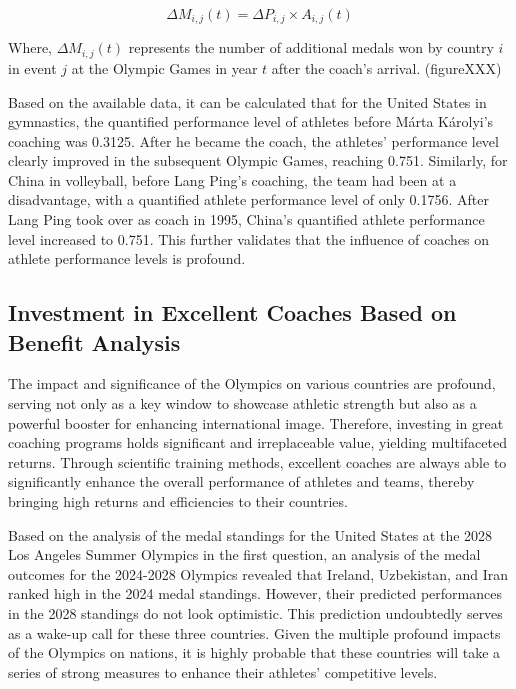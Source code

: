 \documentclass{mcmthesis}
\begin{document}
\begin{equation}
\Delta M_{i, j}(t) = \Delta P_{i, j} \times A_{i, j}(t)
\end{equation}

Where, $\Delta M_{i, j}(t)$ represents the number of additional medals won by country $i$ in event $j$ at the Olympic Games in year $t$ after the coach's arrival.
(figureXXX)

Based on the available data, it can be calculated that for the United States in gymnastics, the quantified performance level of athletes before Márta Károlyi's coaching was 0.3125. After he became the coach, the athletes' performance level clearly improved in the subsequent Olympic Games, reaching 0.751. Similarly, for China in volleyball, before Lang Ping's coaching, the team had been at a disadvantage, with a quantified athlete performance level of only 0.1756. After Lang Ping took over as coach in 1995, China's quantified athlete performance level increased to 0.751. This further validates that the influence of coaches on athlete performance levels is profound.

\subsection{Investment in Excellent Coaches Based on Benefit Analysis}
The impact and significance of the Olympics on various countries are profound, serving not only as a key window to showcase athletic strength but also as a powerful booster for enhancing international image. Therefore, investing in great coaching programs holds significant and irreplaceable value, yielding multifaceted returns. Through scientific training methods, excellent coaches are always able to significantly enhance the overall performance of athletes and teams, thereby bringing high returns and efficiencies to their countries.

Based on the analysis of the medal standings for the United States at the 2028 Los Angeles Summer Olympics in the first question, an analysis of the medal outcomes for the 2024-2028 Olympics revealed that Ireland, Uzbekistan, and Iran ranked high in the 2024 medal standings. However, their predicted performances in the 2028 standings do not look optimistic. This prediction undoubtedly serves as a wake-up call for these three countries. Given the multiple profound impacts of the Olympics on nations, it is highly probable that these countries will take a series of strong measures to enhance their athletes' competitive levels.
\end{document}
